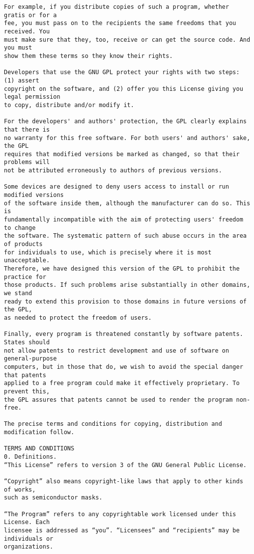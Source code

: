 \begin{verbatim}
For example, if you distribute copies of such a program, whether gratis or for a
fee, you must pass on to the recipients the same freedoms that you received. You
must make sure that they, too, receive or can get the source code. And you must
show them these terms so they know their rights.

Developers that use the GNU GPL protect your rights with two steps: (1) assert
copyright on the software, and (2) offer you this License giving you legal permission
to copy, distribute and/or modify it.

For the developers' and authors' protection, the GPL clearly explains that there is
no warranty for this free software. For both users' and authors' sake, the GPL
requires that modified versions be marked as changed, so that their problems will
not be attributed erroneously to authors of previous versions.

Some devices are designed to deny users access to install or run modified versions
of the software inside them, although the manufacturer can do so. This is
fundamentally incompatible with the aim of protecting users' freedom to change
the software. The systematic pattern of such abuse occurs in the area of products
for individuals to use, which is precisely where it is most unacceptable.
Therefore, we have designed this version of the GPL to prohibit the practice for
those products. If such problems arise substantially in other domains, we stand
ready to extend this provision to those domains in future versions of the GPL,
as needed to protect the freedom of users.

Finally, every program is threatened constantly by software patents. States should
not allow patents to restrict development and use of software on general-purpose
computers, but in those that do, we wish to avoid the special danger that patents
applied to a free program could make it effectively proprietary. To prevent this,
the GPL assures that patents cannot be used to render the program non-free.

The precise terms and conditions for copying, distribution and modification follow.

TERMS AND CONDITIONS
0. Definitions.
“This License” refers to version 3 of the GNU General Public License.

“Copyright” also means copyright-like laws that apply to other kinds of works,
such as semiconductor masks.

“The Program” refers to any copyrightable work licensed under this License. Each
licensee is addressed as “you”. “Licensees” and “recipients” may be individuals or
organizations.


\end{verbatim}
